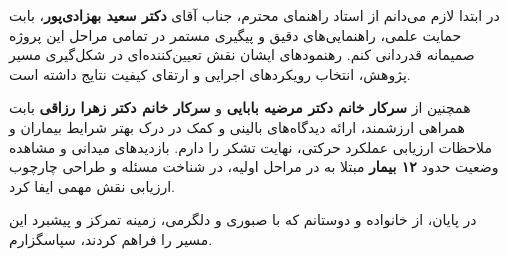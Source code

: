 \begin{Acknowledgements}
	در ابتدا لازم می‌دانم از استاد راهنمای محترم، جناب آقای \textbf{دکتر سعید بهزادی‌پور}، بابت حمایت علمی، راهنمایی‌های دقیق و پیگیری مستمر در تمامی مراحل این پروژه صمیمانه قدردانی کنم. رهنمودهای ایشان نقش تعیین‌کننده‌ای در شکل‌گیری مسیر پژوهش، انتخاب رویکردهای اجرایی و ارتقای کیفیت نتایج داشته است.
	
	همچنین از \textbf{سرکار خانم دکتر مرضیه بابایی} و \textbf{سرکار خانم دکتر زهرا رزاقی} بابت همراهی ارزشمند، ارائه دیدگاه‌های بالینی و کمک در درک بهتر شرایط بیماران و ملاحظات ارزیابی عملکرد حرکتی، نهایت تشکر را دارم. بازدیدهای میدانی و مشاهده وضعیت حدود \textbf{۱۲ بیمار} مبتلا به  در مراحل اولیه، در شناخت مسئله و طراحی چارچوب ارزیابی نقش مهمی ایفا کرد.
	
	در پایان، از خانواده و دوستانم که با صبوری و دلگرمی، زمینه تمرکز و پیشبرد این مسیر را فراهم کردند، سپاسگزارم.
\end{Acknowledgements}
